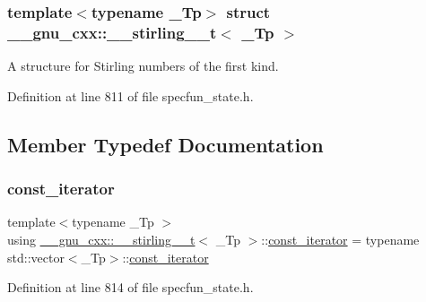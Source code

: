 \subsubsection*{template$<$typename \+\_\+\+Tp$>$\newline
struct \+\_\+\+\_\+gnu\+\_\+cxx\+::\+\_\+\+\_\+stirling\+\_\+\_\+t$<$ \+\_\+\+Tp $>$}

A structure for Stirling numbers of the first kind. 

Definition at line 811 of file specfun\+\_\+state.\+h.



\subsection{Member Typedef Documentation}
\mbox{\label{struct____gnu__cxx_1_1____stirling__1__t_a2b4e459dac02038428602f6315b97941}} 
\subsubsection{\texorpdfstring{const\+\_\+iterator}{const\_iterator}}
{\footnotesize\ttfamily template$<$typename \+\_\+\+Tp $>$ \\
using \hyperlink{struct____gnu__cxx_1_1____stirling__1__t}{\+\_\+\+\_\+gnu\+\_\+cxx\+::\+\_\+\+\_\+stirling\+\_\+\_\+t}$<$ \+\_\+\+Tp $>$\+::\hyperlink{struct____gnu__cxx_1_1____stirling__1__t_a2b4e459dac02038428602f6315b97941}{const\+\_\+iterator} =  typename std\+::vector$<$\+\_\+\+Tp$>$\+::\hyperlink{struct____gnu__cxx_1_1____stirling__1__t_a2b4e459dac02038428602f6315b97941}{const\+\_\+iterator}}



Definition at line 814 of file specfun\+\_\+state.\+h.

\mbox{\label{struct____gnu__cxx_1_1____stirling__1__t_a4dad153706e77f66c38d2a620230ac35}} 
